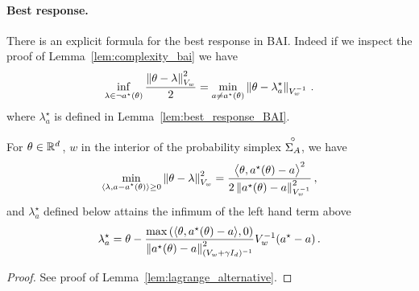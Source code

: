 \paragraph{Best response.} There is an explicit formula for the best response in BAI. Indeed if we inspect the proof of Lemma~\ref{lem:complexity_bai} we have
\[
\inf_{\lambda\in \neg a^\star(\theta)} \frac{\left\lVert\theta - \lambda\right\rVert_{V_w}^2}{2} = \min_{a \neq a^\star(\theta)} \left\lVert\theta-\lambda^\star_a\right\rVert_{V_w^{-1}}\,.
\]
where $\lambda^\star_a$ is defined in Lemma~\ref{lem:best_response_BAI}.

\begin{lemma}
\label{lem:best_response_BAI}
For $\theta \in\mathbb{R}^d\,$, $w$ in the interior of the probability simplex $\overset{\circ}{\Sigma_A}$, we have
\[
\min_{\substack{\langle \lambda,a-a^\star(\theta)\rangle\geq 0}} \left\lVert\theta -\lambda \right\rVert_{V_w}^2 = \frac{\big\langle \theta, a^\star(\theta)-a\big\rangle^2}{2 \left\lVert a^\star(\theta)-a\right\rVert_{V_w^{-1}}^2}\,,
\]
and $\lambda^\star_a$ defined below attains the infimum of the left hand term above
\[
\lambda^\star_a = \theta - \frac{\max\left(\langle \theta, a^\star(\theta)-a\rangle,0\right)}{\left\lVert a^\star(\theta)-a\right\rVert^2_{(V_w+\gamma I_d)^{-1}}} V_w^{-1}(a^\star - a)\,.
\]
\end{lemma}
\begin{proof}
See proof of Lemma~\ref{lem:lagrange_alternative}.
\end{proof}


